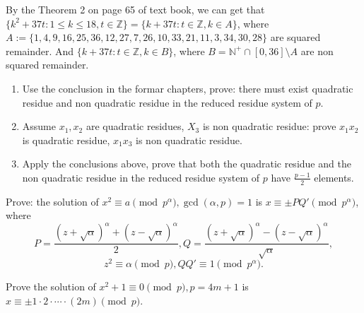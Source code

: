 \documentclass{ctexart}
\begin{document}
\begin{solution}
  By the Theorem 2 on page 65 of text book, we can get that \(\{k^2 + 37t:1 \leq k \leq 18, t \in \mathbb{Z}\}=\{k + 37 t: t \in \mathbb{Z}, k \in A\}\),
  where \(A:=\{1,4,9,16,25,36,12,27,7,26,10,33,21,11,3,34,30,28\}\) are squared remainder.
  And \(\{k + 37t: t \in \mathbb{Z}, k \in B\}\), where \(B=\mathbb{N}^+ \cap[0,36] \setminus A\) are non
  squared remainder.
\end{solution}
\begin{problem}\label{pro:4}
  \begin{enumerate}
    \item Use the conclusion in the formar chapters, prove: there must exist quadratic residue and
      non quadratic residue in the reduced residue system of \(p\).
    \item Assume \(x_1,x_2\) are quadratic residues, \(X_3\) is non quadratic residue:
      prove \(x_1x_2\) is quadratic residue, \(x_1x_3\) is non quadratic residue.
    \item Apply the conclusions above, prove that both the quadratic residue and the non quadratic residue
      in the reduced residue system of \(p\) have
      \(\frac{p-1}{2}\) elements.
  \end{enumerate}
\end{problem}
\begin{problem}\label{pro:5}
  Prove: the solution of \(x^2 \equiv a\pmod{p^\alpha},\gcd(\alpha,p)=1\) is \(x \equiv \pm PQ'\pmod{p^\alpha}\), where \[
    P=\frac{(z + \sqrt{\alpha})^\alpha + (z - \sqrt{\alpha})^\alpha}{2}, Q=\frac{(z + \sqrt{\alpha})^\alpha - (z-\sqrt{\alpha})^\alpha}{\sqrt{\alpha}},
  \]
  \[
    z^2\equiv \alpha\pmod{p}, QQ' \equiv 1 \pmod{p^\alpha}.
  \]
\end{problem}
\begin{problem}\label{pro:6}
  Prove the solution of \(x^2 + 1 \equiv 0 \pmod{p},p=4m + 1\) is \(x \equiv \pm 1 \cdot 2 \cdot \cdots \cdot (2m)\pmod{p}\).
\end{problem}
\end{document}
